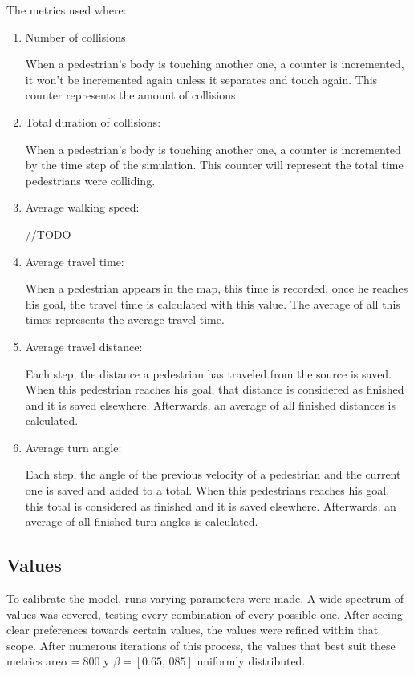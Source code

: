 \documentclass[english]{article}
\numberwithin{equation}{section}
\numberwithin{figure}{section}
\begin{document}
The metrics used where:
\begin{enumerate}
\item Number of collisions


When a pedestrian's body is touching another one, a counter is incremented,
it won't be incremented again unless it separates and touch again.
This counter represents the amount of collisions.

\item Total duration of collisions:


When a pedestrian's body is touching another one, a counter is incremented
by the time step of the simulation. This counter will represent the
total time pedestrians were colliding.

\item Average walking speed:


//TODO

\item Average travel time:


When a pedestrian appears in the map, this time is recorded, once
he reaches his goal, the travel time is calculated with this value.
The average of all this times represents the average travel time.

\item Average travel distance:


Each step, the distance a pedestrian has traveled from the source
is saved. When this pedestrian reaches his goal, that distance is
considered as finished and it is saved elsewhere. Afterwards, an average
of all finished distances is calculated.

\item Average turn angle:


Each step, the angle of the previous velocity of a pedestrian and
the current one is saved and added to a total. When this pedestrians
reaches his goal, this total is considered as finished and it is saved
elsewhere. Afterwards, an average of all finished turn angles is calculated.

\end{enumerate}

\subsection{Values}

To calibrate the model, runs varying parameters were made. A wide
spectrum of values was covered, testing every combination of every
possible one. After seeing clear preferences towards certain values,
the values were refined within that scope. After numerous iterations
of this process, the values that best suit these metrics are$\alpha=800$
y $\beta=[0.65,\,085]$ uniformly distributed.
\end{document}
